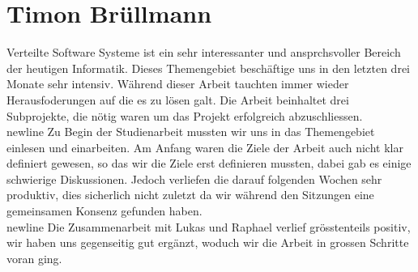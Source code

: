 \section{Timon Brüllmann}

Verteilte Software Systeme ist ein sehr interessanter und ansprchsvoller Bereich der heutigen Informatik. Dieses Themengebiet beschäftige uns in den letzten drei Monate sehr intensiv. Während dieser Arbeit tauchten immer wieder Herausfoderungen auf die es zu lösen galt. Die Arbeit beinhaltet drei Subprojekte, die nötig waren um das Projekt erfolgreich abzuschliessen.
 \\newline
Zu Begin der Studienarbeit mussten wir uns in das Themengebiet einlesen und einarbeiten. Am Anfang waren die Ziele der Arbeit auch nicht klar definiert gewesen, so das wir die Ziele erst definieren mussten, dabei gab es einige schwierige Diskussionen. Jedoch verliefen die darauf folgenden Wochen sehr produktiv, dies sicherlich nicht zuletzt da wir während den Sitzungen eine gemeinsamen Konsenz gefunden haben.\\newline
Die Zusammenarbeit mit Lukas und Raphael verlief grösstenteils positiv, wir haben uns gegenseitig gut ergänzt, woduch wir die Arbeit in grossen Schritte voran ging.

